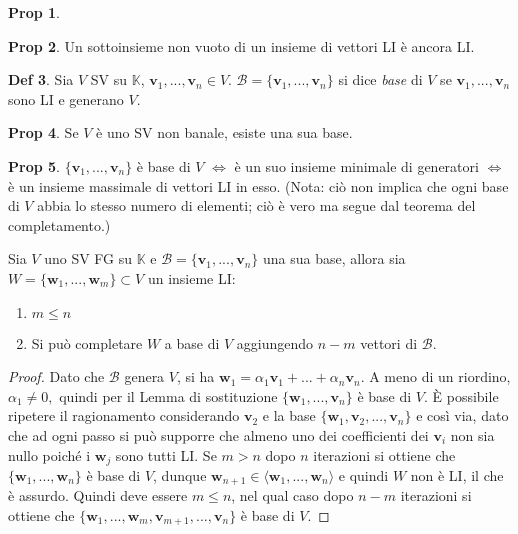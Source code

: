 \documentclass[]{article}
\newcommand{\vv}{\mathbf{v}}
\newcommand{\vw}{\mathbf{w}}
\theoremstyle{definition}
\theoremstyle{definition}
\newtheorem{prop}{Prop}[subsection]
\theoremstyle{definition}
\newtheorem{dfn}[prop]{Def}
\begin{document}
\begin{prop}
\end{prop} \begin{prop} Un sottoinsieme non vuoto di un insieme di vettori LI è ancora LI.

\end{prop}  \begin{dfn} Sia $V$ SV su $\mathbb{K}$, $\vv _1 ,..., \vv _n \in V$. $\mathcal{B}=\{ \vv_1 ,..., \vv_n \}$ si dice \emph{base} di $V$ se $\vv_1 ,..., \vv_n$ sono LI e generano $V$.

 \end{dfn} \begin{prop} Se $V$ è uno SV non banale, esiste una sua base.

\end{prop} \begin{prop} $\{ \vv _1 ,..., \vv _n \}$ è base di $V$ $\Leftrightarrow$ è un suo insieme minimale di generatori $\Leftrightarrow$ è un insieme massimale di vettori LI in esso. (Nota: ciò non implica che ogni base di $V$ abbia lo stesso numero di elementi; ciò è vero ma segue dal teorema del completamento.)

\end{prop} \begin{thm} Sia $V$ uno SV FG su $\mathbb{K}$ e $\mathcal{B} = \{ \vv _1 ,..., \vv _n \}$ una sua base, allora sia $W= \{ \vw _1 ,..., \vw _m \} \subset V$ un insieme LI:
\begin{enumerate}
\item $m \leq n$
\item Si può completare $W$ a base di $V$ aggiungendo $n-m$ vettori di $\mathcal{B}$.
\end{enumerate}
\end{thm} 
\begin{proof}
Dato che $\mathcal{B} $ genera $V $, si ha $ \vw_1=\alpha_1 \vv_1 +...+ \alpha_n \vv_n.$ A meno di un riordino, $\alpha_1 \neq 0,$ quindi per il Lemma di sostituzione $\{ \vw _1 ,..., \vv _n \}$ è base di $V.$ È possibile ripetere il ragionamento considerando $\vv_2$ e la base $\{ \vw _1 , \vv_2, ..., \vv _n \}$ e così via, dato che ad ogni passo si può supporre che almeno uno dei coefficienti dei $\vv_i$ non sia nullo poiché i $\vw_j$ sono tutti LI. Se $m > n$ dopo $n$ iterazioni si ottiene che $\{\vw_1,...,\vw_n\}$ è base di $V$, dunque $\vw_{n+1} \in \langle \vw_1,...,\vw_n \rangle$ e quindi $W$ non è LI, il che è assurdo. Quindi deve essere $m \leq n$, nel qual caso dopo $n-m$ iterazioni si ottiene che $\{\vw_1,...,\vw_m,\vv_{m+1},...,\vv_n\}$ è base di $V.$
\end{proof}
\end{document}
